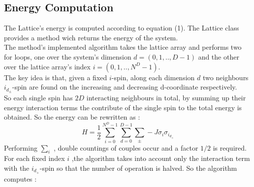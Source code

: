 \documentclass[11pt,a4paper]{article}
\begin{document}

\newpage
\subsection{Energy Computation}

The Lattice's energy is computed according to equation (1).
The Lattice class provides a method wich returns the energy of the system. \\
The method's implemented algorithm takes the lattice array and performs two for loops, one over the system's dimension $d = (0,1,..,D-1)$ and the other over the lattice array's index $i = (0,1,..,N^D-1)$. \\
The key idea is that, given a fixed $i$-spin, along each dimension $d$ two neighbours $i_{d_\pm}$-spin are found on the increasing and decreasing d-coordinate respectively.
\\So each single spin has $2D$ interacting neighbours in total, by summing up their energy interaction terms the contribute of the single spin to the total energy is obtained. So the energy can be rewritten as :
\begin{equation}
H = \frac{1}{2}\sum_{i=0}^{N^D-1}\sum_{d=0}^{D-1}\sum_{\pm}^{} -J\sigma_i\sigma_{i_{d_\pm}}
\end{equation}
Performing $\sum_{i}^{}$ , double countings of couples occur and a factor $1/2$ is required. \\
For each fixed index $i$ ,the algorithm takes into account only the interaction term with the
$i_{d_+}$-spin so that the number of operation is halved. So the algorithm computes :
\end{document}
